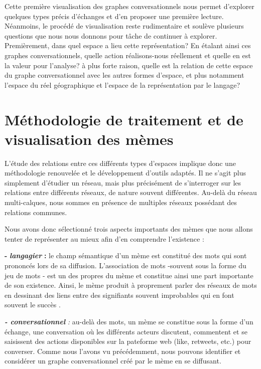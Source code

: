 Cette première visualisation des graphes conversationnels nous permet d{\textquoteright}explorer quelques types précis d{\textquoteright}échanges et d{\textquoteright}en proposer une première lecture. Néanmoins, le procédé de visualisation reste rudimentaire et soulève plusieurs questions que nous nous donnons pour t\^ache de continuer à explorer. Premièrement, dans quel espace a lieu cette représentation? En étalant ainsi ces graphes conversationnels, quelle action réalisons-nous réellement et quelle en est la valeur pour l{\textquoteright}analyse? à plus forte raison, quelle est la relation de cette espace du graphe conversationnel avec les autres formes d{\textquoteright}espace, et plus notamment l{\textquoteright}espace du réel géographique et l{\textquoteright}espace de la représentation par le langage?

\section{Méthodologie de traitement et de visualisation des mèmes}

L{\textquoteright}étude des relations entre ces différents types
d{\textquoteright}espaces implique donc une méthodologie renouvelée
et le développement d{\textquoteright}outils adaptés. Il ne
s{\textquoteright}agit plus simplement d{\textquoteright}étudier un
réseau, mais plus précisément de s{\textquoteright}interroger sur
les relations entre différents réseaux, de nature souvent
différentes. Au-delà du réseau multi-calques, nous sommes en
présence de multiples réseaux possédant des relations communes.

Nous avons donc sélectionné trois aspects importants des mèmes que
nous allons tenter de représenter au mieux afin d{\textquoteright}en
comprendre l{\textquoteright}existence :

\textbf{{}- }\textbf{\textit{langagier }}\textbf{:} le champ
sémantique d{\textquoteright}un mème est constitué des mots qui
sont prononcés lors de sa diffusion. L{\textquoteright}association de
mots -souvent sous la forme du jeu de mots - est un des propres du
mème et constitue ainsi une part importante de son existence. Ainsi,
le mème produit à proprement parler des réseaux de mots en
dessinant des liens entre des signifiants souvent improbables qui en
font souvent le succès \citep{Bauckhage2011}.

\textbf{\textit{{}- conversationnel }}\textit{: }au-delà des mots, un
mème se constitue sous la forme d{\textquoteright}un échange, une
conversation o\`u les différents acteurs discutent, commentent et se
saisissent des actions disponibles sur la pateforme web (like,
retweets, etc.) pour converser. Comme nous l{\textquoteright}avons vu
précédemment, nous pouvons identifier et considérer un graphe
conversationnel créé par le mème en se diffusant.

